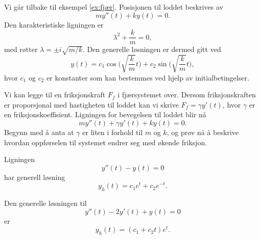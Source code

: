 \documentclass{article}
\theoremstyle{definition}
\newenvironment{ex}
{\pushQED{\qed}\renewcommand{\qedsymbol}{$\triangle$}\exx}
{\popQED\endexx}
\theoremstyle{remark}
\begin{document}
\begin{multicols*}{2}
\begin{ex}
  Vi går tilbake til eksempel \ref{ex:fjær}. Posisjonen til loddet beskrives av
  \begin{equation*}
    m y''(t) + ky(t) = 0.
  \end{equation*}
  Den karakteristiske ligningen er
  \begin{equation*}
    \lambda^2 + \frac{k}{m} = 0,
  \end{equation*}
  med røtter $\lambda = \pm i \sqrt{m / k}$. Den generelle løsningen er dermed gitt ved
  \begin{equation*}
    y(t) = c_1 \cos\bigg(\sqrt{\frac{k}{m}} t\bigg) + c_2 \sin\bigg(\sqrt{\frac{k}{m}} t\bigg),
  \end{equation*}
  hvor $c_1$ og $c_2$ er konstanter som kan bestemmes ved hjelp av initialbetingelser.
\end{ex}

\begin{ex}
  Vi kan legge til en friksjonskraft $F_f$ i fjærsystemet over. Dersom friksjonskraften er proporsjonal med hastigheten til loddet kan vi skrive $F_f = \gamma y'(t)$, hvor $\gamma$ er en friksjonskoeffisient. Ligningen for bevegelsen til loddet blir nå
  \begin{equation*}
    m y''(t) + \gamma y'(t) + ky(t) = 0.
  \end{equation*}
  Begynn med å anta at $\gamma$ er liten i forhold til $m$ og $k$, og prøv nå å beskrive hvordan oppførselen til systemet endrer seg med økende friksjon.
\end{ex}

\begin{ex}
  Ligningen
  \begin{equation*}
    y''(t) - y(t) = 0
  \end{equation*}
  har generell løsning
  \begin{equation*}
    y_h(t) = c_1 e^{t} + c_2 e^{-t}.
  \end{equation*}
\end{ex}

\begin{ex}
  Den generelle løsningen til
  \begin{equation*}
    y''(t) - 2 y'(t) + y(t) = 0
  \end{equation*}
  er
  \begin{equation*}
    y_h(t) = (c_1 + c_2 t) e^t.
  \end{equation*}
\end{ex}


\end{multicols*}
\end{document}
